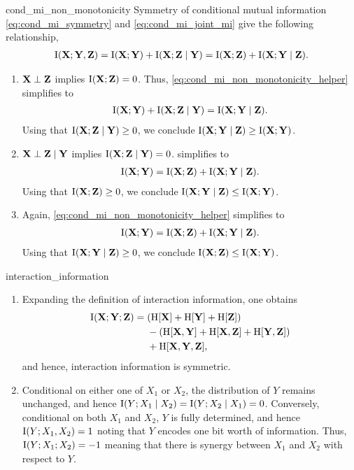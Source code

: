 \begin{solution}{cond_mi_non_monotonicity}
  Symmetry of conditional mutual information \eqref{eq:cond_mi_symmetry} and \cref{eq:cond_mi_joint_mi} give the following relationship, \begin{align}
    \I{\rX}{\rY,\rZ} = \I{\rX}{\rY} + \I{\rX}{\rZ \mid \rY} = \I{\rX}{\rZ} + \I{\rX}{\rY \mid \rZ}. \label{eq:cond_mi_non_monotonicity_helper}
  \end{align}
  \begin{enumerate}
    \item $\mathbf{X} \perp \mathbf{Z}$ implies $\I{\rX}{\rZ} = 0$.
    Thus, \cref{eq:cond_mi_non_monotonicity_helper} simplifies to \begin{align*}
      \I{\rX}{\rY} + \I{\rX}{\rZ \mid \rY} = \I{\rX}{\rY \mid \rZ}.
    \end{align*}
    Using that $\I{\rX}{\rZ \mid \rY} \geq 0$, we conclude $\I{\rX}{\rY \mid \rZ} \geq \I{\rX}{\rY}$.

    \item $\mathbf{X} \perp \mathbf{Z} \mid \mathbf{Y}$ implies $\I{\rX}{\rZ \mid \rY} = 0$.
     simplifies to \begin{align*}
      \I{\rX}{\rY} = \I{\rX}{\rZ} + \I{\rX}{\rY \mid \rZ}.
    \end{align*}
    Using that $\I{\rX}{\rZ} \geq 0$, we conclude $\I{\rX}{\rY \mid \rZ} \leq \I{\rX}{\rY}$.

    \item Again, \cref{eq:cond_mi_non_monotonicity_helper} simplifies to \begin{align*}
      \I{\rX}{\rY} = \I{\rX}{\rZ} + \I{\rX}{\rY \mid \rZ}.
    \end{align*}
    Using that $\I{\rX}{\rY \mid \rZ} \geq 0$, we conclude $\I{\rX}{\rZ} \leq \I{\rX}{\rY}$.
  \end{enumerate}
\end{solution}

\begin{solution}{interaction_information}
  \begin{enumerate}[beginpenalty=10000]
    \item Expanding the definition of interaction information, one obtains \begin{align*}
      \I{\rX}{\rY ; \rZ} = \; &(\H{\rX} + \H{\rY} + \H{\rZ}) \\
      &- (\H{\rX,\rY} + \H{\rX,\rZ} + \H{\rY,\rZ}) \\
      &+ \H{\rX,\rY,\rZ},
    \end{align*} and hence, interaction information is symmetric.

    \item Conditional on either one of $X_1$ or $X_2$, the distribution of $Y$ remains unchanged, and hence $\I{Y}{X_1 \mid X_2} = \I{Y}{X_2 \mid X_1} = 0$.
    Conversely, conditional on both $X_1$ and $X_2$, $Y$ is fully determined, and hence $\I{Y}{X_1,X_2} = 1$ noting that $Y$ encodes one bit worth of information.
    Thus, $\I{Y ; X_1}{X_2} = -1$ meaning that there is synergy between $X_1$ and $X_2$ with respect to $Y$.
  \end{enumerate}
\end{solution}

